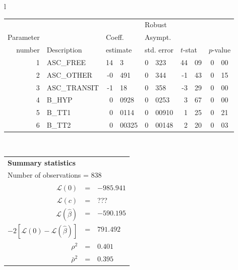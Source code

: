   \begin{tabular}{l}
\begin{tabular}{rlr@{.}lr@{.}lr@{.}lr@{.}l}
         &                       &   \multicolumn{2}{l}{}    & \multicolumn{2}{l}{Robust}  &     \multicolumn{4}{l}{}   \\
Parameter &                       &   \multicolumn{2}{l}{Coeff.}      & \multicolumn{2}{l}{Asympt.}  &     \multicolumn{4}{l}{}   \\
number &  Description                     &   \multicolumn{2}{l}{estimate}      & \multicolumn{2}{l}{std. error}  &   \multicolumn{2}{l}{$t$-stat}  &   \multicolumn{2}{l}{$p$-value}   \\

\hline

1 & ASC\_FREE & 14&3 & 0&323 & 44&09 & 0&00 \\
2 & ASC\_OTHER & -0&491 & 0&344 & -1&43 & 0&15 \\
3 & ASC\_TRANSIT & -1&18 & 0&358 & -3&29 & 0&00 \\
4 & B\_HYP & 0&0928 & 0&0253 & 3&67 & 0&00 \\
5 & B\_TT1 & 0&0114 & 0&00910 & 1&25 & 0&21 \\
6 & B\_TT2 & 0&00325 & 0&00148 & 2&20 & 0&03 \\
\hline

\end{tabular}
\\
\begin{tabular}{rcl}
\multicolumn{3}{l}{\bf Summary statistics}\\
\multicolumn{3}{l}{ Number of observations = $838$} \\
 $\mathcal{L}(0)$ &=&  $-985.941$ \\
 $\mathcal{L}(c)$ &=& ???\\
 $\mathcal{L}(\hat{\beta})$ &=& $-590.195 $  \\
 $-2[\mathcal{L}(0) -\mathcal{L}(\hat{\beta})]$ &=& $791.492$ \\
    $\rho^2$ &=&   $0.401$ \\
    $\bar{\rho}^2$ &=&    $0.395$ \\
\end{tabular}
\end{tabular}

